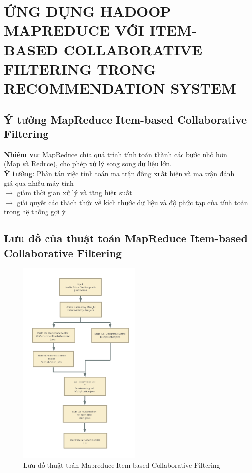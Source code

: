 \chapter[ỨNG DỤNG HADOOP MAPREDUCE VỚI ITEM-BASED COLLABORATIVE FILTERING TRONG RECOMMENDATION SYSTEM]
 {\LARGE ỨNG DỤNG HADOOP MAPREDUCE VỚI ITEM-BASED COLLABORATIVE FILTERING TRONG RECOMMENDATION SYSTEM}

\section{Ý tưởng MapReduce Item-based Collaborative Filtering}
\textbf{Nhiệm vụ}: MapReduce chia quá trình tính toán thành các bước nhỏ hơn \\
\hspace*{2cm}(Map và Reduce), cho phép xử lý song song dữ liệu lớn. \\
\vspace{0.5cm}
\textbf{Ý tưởng}: Phân tán việc tính toán ma trận đồng xuất hiện và ma trận đánh \\
\hspace*{1.7cm}giá qua nhiều máy tính \\
\hspace*{1.7cm}$\rightarrow$ giảm thời gian xử lý và tăng hiệu suất \\
\hspace*{1.7cm}$\rightarrow$ giải quyết các thách thức về kích thước dữ liệu và độ phức tạp của tính toán trong hệ thống gợi ý

\section{Lưu đồ của thuật toán MapReduce Item-based Collaborative Filtering}
\begin{figure}[h]
    \centering
    \includegraphics[width=6cm]{images/RecommenderSystem.png}
    \caption{Lưu đồ thuật toán Mapreduce Item-based Collaborative Filtering}
\end{figure}
